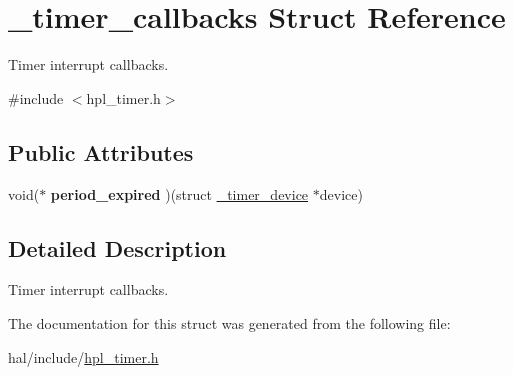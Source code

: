 \hypertarget{struct__timer__callbacks}{}\section{\+\_\+timer\+\_\+callbacks Struct Reference}
\label{struct__timer__callbacks}


Timer interrupt callbacks.  




{\ttfamily \#include $<$hpl\+\_\+timer.\+h$>$}

\subsection*{Public Attributes}
\begin{DoxyCompactItemize}
\item 
\mbox{\label{struct__timer__callbacks_a31b5c1e06d8e187552130fba50080715}} 
void($\ast$ {\bfseries period\+\_\+expired} )(struct \hyperlink{struct__timer__device}{\+\_\+timer\+\_\+device} $\ast$device)
\end{DoxyCompactItemize}


\subsection{Detailed Description}
Timer interrupt callbacks. 

The documentation for this struct was generated from the following file\+:\begin{DoxyCompactItemize}
\item 
hal/include/\hyperlink{hpl__timer_8h}{hpl\+\_\+timer.\+h}\end{DoxyCompactItemize}
